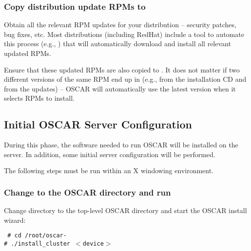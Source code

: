 \subsubsection{Copy distribution update RPMs to }
\label{det:distro-updates}

Obtain all the relevant RPM updates for your distribution -- security
patches, bug fixes, etc.  Most distributions (including RedHat)
include a tool to automate this process (e.g., ) that
will automatically download and install all relevant updated RPMs.

Ensure that these updated RPMs are also copied to
.  It does not matter if two different versions of
the same RPM end up in  (e.g.,
 from the installation CD and
 from the updates) -- OSCAR will
automatically use the latest version when it selects RPMs to install.

  
\subsection{Initial OSCAR Server Configuration}

During this phase, the software needed to run OSCAR will be installed
on the server. In addition, some initial server configuration will be
performed. 

The following steps must be run within an X windowing environment.


\subsubsection{Change to the OSCAR directory and run }
\label{det:installcluster}

Change directory to the top-level OSCAR directory and start the OSCAR
install wizard:

\vspace{11pt}
{\tt
\# cd /root/oscar-\oscarversion \\
\indent \# ./install\_cluster $<$device$>$
}
\vspace{11pt}
  
